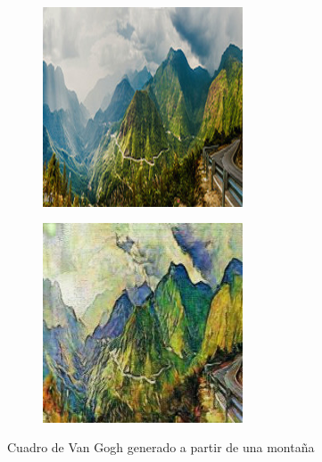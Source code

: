 \documentclass[[../main.tex]{subfiles}
\begin{document}
        \begin{figure}[!htb]
            \begin{subfigure}[b]{0.49\textwidth}
            \includegraphics[width=0.65\textwidth]{imagenes/imagen2cuadro/dataset/vangogh/2014-08-20 08_13_24.jpg}
            \end{subfigure}
        \hfill
            \begin{subfigure}[b]{0.49\textwidth}
            \includegraphics[width=0.65\textwidth]{imagenes/imagen2cuadro/dataset/vangogh/2014-08-20 08_13_24_2.jpg}
            \end{subfigure}
        \caption{Cuadro de Van Gogh generado a partir de una montaña}
        \label{fig:vangogh_cuadro_montaña_carretera}
        \end{figure}
        
\end{document}

